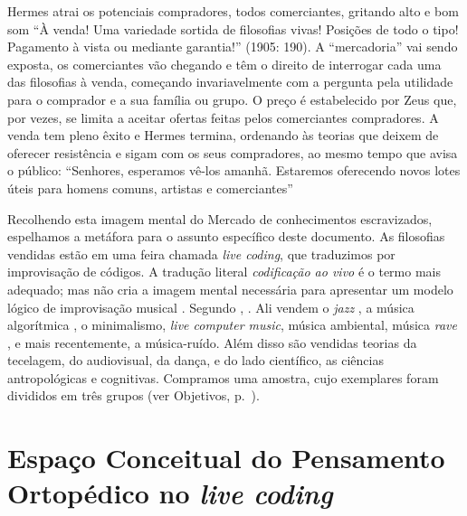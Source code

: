 \begin{citacao}
Hermes atrai os potenciais compradores, todos comerciantes, gritando alto e bom som “À venda! Uma variedade sortida de filosofias vivas! Posições de todo o tipo! Pagamento à vista ou mediante garantia!” (1905: 190). A “mercadoria” vai sendo exposta, os comerciantes vão chegando e têm o direito de interrogar cada uma das filosofias à venda, começando invariavelmente com a pergunta pela utilidade para o comprador e a sua família ou grupo. O preço é estabelecido por Zeus que, por vezes, se limita a aceitar ofertas feitas pelos comerciantes compradores. A venda tem pleno êxito e Hermes termina, ordenando às teorias que deixem de oferecer resistência e sigam com os seus compradores, ao mesmo tempo que avisa o público: “Senhores, esperamos vê-los amanhã. Estaremos oferecendo novos lotes úteis para homens comuns, artistas e comerciantes”   
\end{citacao}

Recolhendo esta imagem mental do Mercado de conhecimentos escravizados, espelhamos a metáfora para o assunto específico deste documento. As filosofias vendidas estão em uma feira chamada \emph{live coding}, que traduzimos por  improvisação de códigos. A tradução literal \emph{codificação ao vivo} é o termo mais adequado; mas não cria a imagem mental necessária para apresentar um modelo lógico de improvisação musical . Segundo , . Ali vendem o \emph{jazz} \cite{sorensen_keith_2009,sorensen_disklavier_2013}, a música algorítmica \cite{magnusson_algorithms_2011}, o minimalismo, \emph{live computer music}, música ambiental, música \emph{rave} \cite{ward_live_2004}, e mais recentemente, a música-ruído. Além disso são vendidas teorias da tecelagem, do audiovisual, da dança, e do lado científico, as ciências antropológicas e cognitivas. Compramos uma amostra, cujo exemplares foram divididos em três grupos (ver Objetivos, p.~\pageref{sec:objetivos}).


\section*{Espaço Conceitual do Pensamento Ortopédico no \emph{live coding}}

